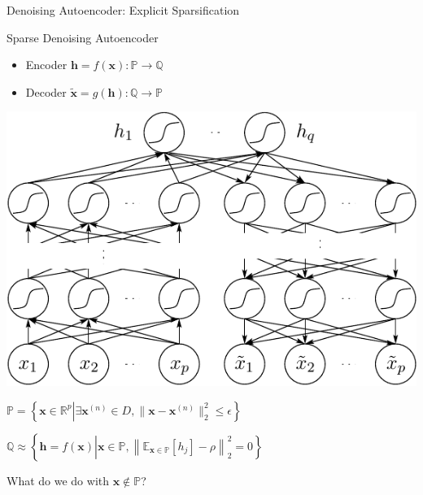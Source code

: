 \documentclass{beamer}
\newcommand{\vect}[1]{\mathbf{#1}}
\newcommand{\vh}[0]{\vect{h}}
\newcommand{\vx}[0]{\vect{x}}
\newcommand{\QQ}[0]{\mathbb{Q}}
\newcommand{\PP}[0]{\mathbb{P}}
\newcommand{\RR}[0]{\mathbb{R}}
\newcommand{\E}[0]{\mathbb{E}}
\begin{document}
\begin{frame}{Denoising Autoencoder: Explicit Sparsification}
\begin{minipage}[t!]{0.55\textwidth}
    Sparse Denoising Autoencoder
{ \small
    \begin{itemize}
        \item Encoder $\vh = f(\vx): \PP \to \QQ$
        \item Decoder $\tilde{\vx} = g(\vh): \QQ \to \PP$
    \end{itemize}
}

    \centering
    \includegraphics[width=0.9\columnwidth]{./sdae.pdf}

    \vspace{2mm}
    \begin{flushleft}
{
            \small
            $
            \PP = \left\{ \vx \in \RR^p \left| \exists \vx^{(n)}
            \in D, \| \vx - \vx^{(n)} \|_2^2 \leq \epsilon
            \right. \right\}
            $

            $ 
            \QQ \approx \left\{\vh = f(\vx) \left|
            \vx \in \PP, \left\| \E_{\vx \in \PP}\left[ h_j \right] - \rho \right\|_2^2 = 0
             \right.\right\}
             $
}
    \end{flushleft}
    \vfill
\end{minipage}
\hfill
\begin{minipage}[t!]{0.44\textwidth}
\vskip 0pt
    What do we do with $\vx \notin \PP$?


\end{minipage}
\end{frame}
\end{document}
